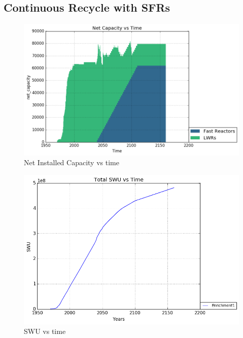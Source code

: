 \subsection{Continuous Recycle with \gls{SFR}s}
\begin{figure}
	\includegraphics[width=\linewidth]{./images/fr/power_plot.png}
	\caption{Net Installed Capacity vs time}
	\label{fig:fr_capacity}
\end{figure}

\begin{figure}
	\includegraphics[width=\linewidth]{./images/fr/Enrichment1_SWU.png}
	\caption{SWU vs time}
	\label{fig:fr_swu}
\end{figure}


